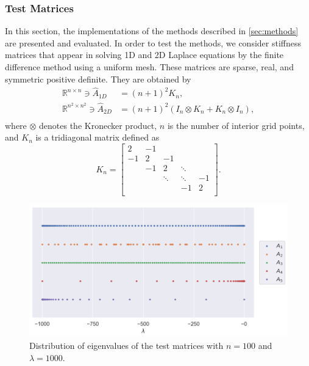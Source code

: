 \subsubsection*{Test Matrices}
\label{sec:testmatrices}

In this section, the implementations of the methods described in \autoref{sec:methods}
are presented and evaluated. In order to test the methods, we consider stiffness
matrices that appear in solving 1D and 2D Laplace equations by the finite difference
method using a uniform mesh. These matrices are sparse, real, and symmetric positive definite.
They are obtained by
\begin{equation*}
    \begin{aligned}
        \mathbb{R}^{n \times n} \ni \hat{A}_{1D} & = (n+1)^2 K_n,\\
        \mathbb{R}^{n^2 \times n^2} \ni \hat{A}_{2D} & = (n+1)^2  (I_n \otimes K_n + K_n \otimes I_n),\\
        \end{aligned}
\end{equation*}
where $\otimes$ denotes the Kronecker product, $n$ is the number of interior
grid points, and $K_n$ is a tridiagonal matrix defined as
\begin{equation*}
    K_n =
    \begin{bmatrix}
        2 & -1 &  &  &  \\
        -1 & 2 & -1 &  &  \\
         & -1 & 2 & \ddots &  \\
         &  & \ddots & \ddots & -1 \\
         &  &  & -1 & 2  \\
    \end{bmatrix}.
\end{equation*}

\begin{figure}[t!]
    \centering
    \includegraphics[width=.8\textwidth]{img/eigvals.png}
    \caption{
        Distribution of eigenvalues of the test matrices with $n=100$ and
        $\lambda = 1000$.
    }
    \label{fig:eigenvaluedistributions}
\end{figure}

